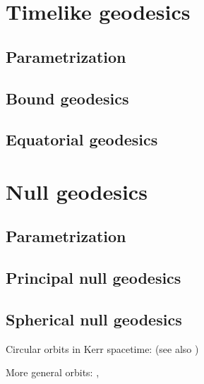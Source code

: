 \section{Timelike geodesics}

\subsection{Parametrization}

\subsection{Bound geodesics}

\subsection{Equatorial geodesics}


\section{Null geodesics}

\subsection{Parametrization}

\subsection{Principal null geodesics}

\subsection{Spherical null geodesics}






Circular orbits in Kerr spacetime: \cite{BardePT72} (see also \cite{Barde73})

More general orbits: \cite{Perez-Giz11}, \cite{GrossLP12}
